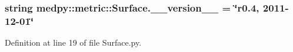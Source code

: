 \hypertarget{namespacemedpy_1_1metric_1_1Surface_a6ee35c2b6fd0a8587a1806936a0ed117}{
\subsubsection[{\_\-\_\-version\_\-\_\-}]{\setlength{\rightskip}{0pt plus 5cm}string {\bf medpy::metric::Surface.\_\-\_\-version\_\-\_\-} = \char`\"{}r0.4, 2011-\/12-\/01\char`\"{}}}
\label{namespacemedpy_1_1metric_1_1Surface_a6ee35c2b6fd0a8587a1806936a0ed117}


Definition at line 19 of file Surface.py.

